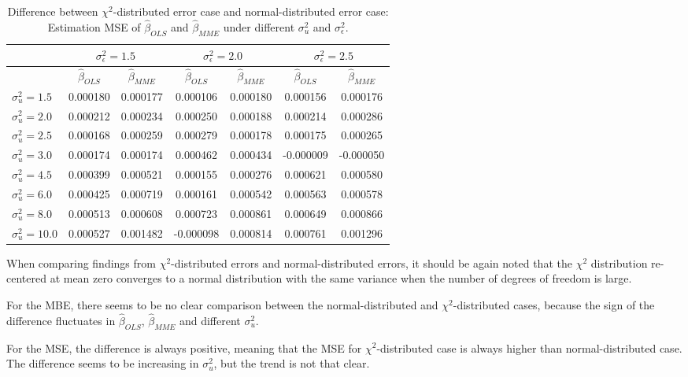 \documentclass{article}
\begin{document}
\begin{table}[ht]
    \centering
    \caption{Difference between $\chi^2$-distributed error case and normal-distributed error case: Estimation MSE of $\hat{\beta}_{OLS}$ and $\hat{\beta}_{MME}$ under different $\sigma^2_u$ and $\sigma^2_\epsilon$.}
    \label{Tab:MSE_diff_chi_normal}
    \begin{tabular}[t]{lcccccc}
        \hline
        &\multicolumn{2}{c}{$\sigma^2_\epsilon=1.5$}&\multicolumn{2}{c}{$\sigma^2_\epsilon=2.0$}&\multicolumn{2}{c}{$\sigma^2_\epsilon=2.5$}\\
        \hline
        &$\hat{\beta}_{OLS}$&$\hat{\beta}_{MME}$&$\hat{\beta}_{OLS}$&$\hat{\beta}_{MME}$&$\hat{\beta}_{OLS}$&$\hat{\beta}_{MME}$\\
        \hline
        $\sigma^2_u = 1.5$&0.000180&0.000177&0.000106&0.000180&0.000156&0.000176\\
        $\sigma^2_u = 2.0$&0.000212&0.000234&0.000250&0.000188&0.000214&0.000286\\
        $\sigma^2_u = 2.5$&0.000168&0.000259&0.000279&0.000178&0.000175&0.000265\\
        $\sigma^2_u = 3.0$&0.000174&0.000174&0.000462&0.000434&-0.000009&-0.000050\\
        $\sigma^2_u = 4.5$&0.000399&0.000521&0.000155&0.000276&0.000621&0.000580\\
        $\sigma^2_u = 6.0$&0.000425&0.000719&0.000161&0.000542&0.000563&0.000578\\
        $\sigma^2_u = 8.0$&0.000513&0.000608&0.000723&0.000861&0.000649&0.000866\\
        $\sigma^2_u = 10.0$&0.000527&0.001482&-0.000098&0.000814&0.000761&0.001296\\
        \hline
    \end{tabular}
\end{table}

When comparing findings from $\chi^2$-distributed errors and normal-distributed errors, it should be again noted that
the $\chi^2$ distribution re-centered at mean zero converges to a normal distribution with the same variance when the number of degrees of freedom is large.

For the MBE, there seems to be no clear comparison between the normal-distributed and $\chi^2$-distributed cases,
because the sign of the difference fluctuates in $\hat{\beta}_{OLS}$, $\hat{\beta}_{MME}$ and different $\sigma^2_u$.

For the MSE, the difference is always positive, meaning that the MSE for $\chi^2$-distributed case is always higher than normal-distributed case.
The difference seems to be increasing in $\sigma^2_u$, but the trend is not that clear. 
\end{document}

